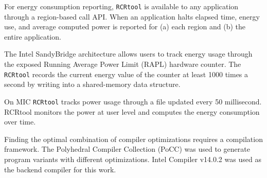 For energy consumption reporting, \texttt{RCRtool} is available to any
application through a region-based call API.
When an application halts elapsed time, energy use, and average computed
power is reported for (a) each region and (b) the entire application.

The Intel SandyBridge architecture allows users to track energy usage through 
the exposed Running Average Power Limit (RAPL) hardware counter. 
The \texttt{RCRtool} records the current energy value of the counter at least 1000 times a second by writing 
into a shared-memory data structure. %

On MIC \texttt{RCRtool} tracks power usage through a file updated every 50 millisecond.
RCRtool monitors the power at user level and computes the energy consumption over time.

Finding the optimal combination of compiler optimizations 
requires a compilation framework. The Polyhedral Compiler Collection (PoCC) was used to generate program 
variants with different optimizations. Intel Compiler v14.0.2 was used as the backend compiler for this work. 
